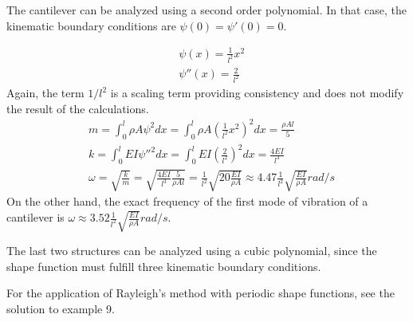 \begin{Answer}[ref={rayleigh_sdof}]
\parbox{.7\textwidth}{The cantilever can be analyzed using a second order polynomial. In that case, the kinematic boundary conditions are $\psi(0) = \psi'(0) = 0$.} \hspace{1em}
\parbox{.25\textwidth}{}
\begin{align*}
&\psi(x) = \frac{1}{l^2} x^2 \\
&\psi''(x) = \frac{2}{l^2}
\end{align*}
Again, the term $1/l^2$ is a scaling term providing consistency and does not modify the result of the calculations.
\begin{align*}
&m = \int_0^l \rho A\psi^2dx = \int_0^l \rho A \left(\frac{1}{l^2} x^2\right)^2dx = \frac{\rho Al}{5} \\
&k = \int_0^l EI \psi''^2 dx = \int_0^l EI \left(\frac{2}{l^2}\right)^2dx = \frac{4EI}{l^3} \\
&\omega = \sqrt{\frac{k}{m}} = \sqrt{\frac{4EI}{l^3}\frac{5}{\rho Al}} = \frac{1}{l^2}\sqrt{20\frac{EI}{\rho A}} \approx 4.47\frac{1}{l^2}\sqrt{\frac{EI}{\rho A}} rad/s
\end{align*}
On the other hand, the exact frequency of the first mode of vibration of a cantilever is $\omega\approx3.52\frac{1}{l^2}\sqrt{\frac{EI}{\rho A}}rad/s$.

The last two structures can be analyzed using a cubic polynomial, since the shape function must fulfill three kinematic boundary conditions.

For the application of Rayleigh's method with periodic shape functions, see the solution to example 9.
\end{Answer}
